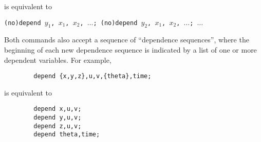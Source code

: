 is equivalent to

\texttt{(no)depend $y_1$, $x_1$, $x_2$, $\ldots$; (no)depend $y_2$, $x_1$, $x_2$, $\ldots$; $\ldots$}

Both commands also accept a sequence of ``dependence sequences'',
where the beginning of each new dependence sequence is indicated by a
list of one or more dependent variables.  For example,
\begin{verbatim}
        depend {x,y,z},u,v,{theta},time;
\end{verbatim}
is equivalent to
\begin{verbatim}
        depend x,u,v;
        depend y,u,v;
        depend z,u,v;
        depend theta,time;
\end{verbatim}
